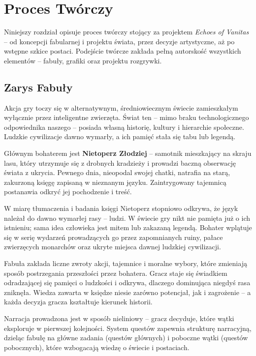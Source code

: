 \chapter{Proces Twórczy}

Niniejszy rozdział opisuje proces twórczy stojący za projektem \textit{Echoes of Vanitas} – od koncepcji fabularnej i projektu świata, przez decyzje artystyczne, aż po wstępne szkice postaci. Podejście twórcze zakłada pełną autorskość wszystkich elementów – fabuły, grafiki oraz projektu rozgrywki.

\section{Zarys Fabuły}

Akcja gry toczy się w alternatywnym, średniowiecznym świecie zamieszkałym wyłącznie przez inteligentne zwierzęta. Świat ten – mimo braku technologicznego odpowiednika naszego – posiada własną historię, kultury i hierarchie społeczne. Ludzkie cywilizacje dawno wymarły, a ich pamięć stała się tabu lub legendą.

Głównym bohaterem jest \textbf{Nietoperz Złodziej} – samotnik mieszkający na skraju lasu, który utrzymuje się z drobnych kradzieży i prowadzi baczną obserwację świata z ukrycia. Pewnego dnia, nieopodal swojej chatki, natrafia na starą, zakurzoną księgę zapisaną w nieznanym języku. Zaintrygowany tajemnicą postanawia odkryć jej pochodzenie i treść.

W miarę tłumaczenia i badania księgi Nietoperz stopniowo odkrywa, że język należał do dawno wymarłej rasy – ludzi. W świecie gry nikt nie pamięta już o ich istnieniu; sama idea człowieka jest mitem lub zakazaną legendą. Bohater wplątuje się w serię wydarzeń prowadzących go przez zapomnianych ruiny, pałace zwierzęcych monarchów oraz ukryte miejsca dawnej ludzkiej cywilizacji.

Fabuła zakłada liczne zwroty akcji, tajemnice i moralne wybory, które zmieniają sposób postrzegania przeszłości przez bohatera. Gracz staje się świadkiem odradzającej się pamięci o ludzkości i odkrywa, dlaczego dominująca niegdyś rasa zniknęła. Wiedza zawarta w księdze niesie zarówno potencjał, jak i zagrożenie – a każda decyzja gracza kształtuje kierunek historii.

Narracja prowadzona jest w sposób nieliniowy – gracz decyduje, które wątki eksploruje w pierwszej kolejności. System questów zapewnia strukturę narracyjną, dzieląc fabułę na główne zadania (questów głównych) i poboczne wątki (questów pobocznych), które wzbogacają wiedzę o świecie i postaciach.

